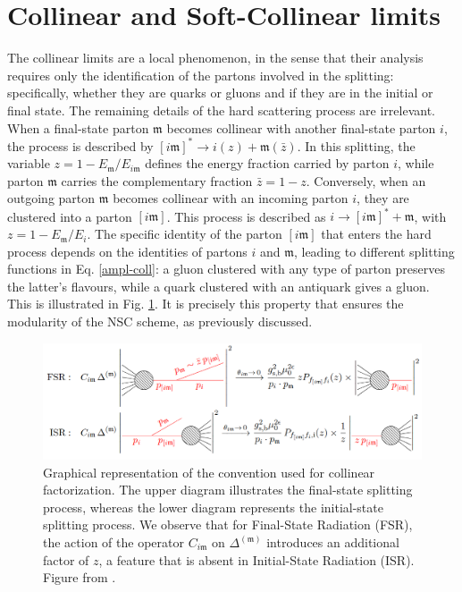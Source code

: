\documentclass[a4paper, 12pt]{book}
\newcommand{\um}{\mathfrak{m}}
\begin{document}
\section{Collinear and Soft-Collinear limits}
\label{section-coll-soft}
The collinear limits are a local phenomenon, in the sense that their analysis requires only the identification of the partons involved in the splitting: specifically, whether they are quarks or gluons and if they are in the initial or final state. The remaining details of the hard scattering process are irrelevant. When a final-state parton $\um$ becomes collinear with another final-state parton $i$, the process is described by $[i\um]^* \to i(z) + \um(\bar{z})$. In this splitting, the variable $z = 1 - E_{\um}/E_{i\um}$ defines the energy fraction carried by parton $i$, while parton $\um$ carries the complementary fraction $\bar{z}=1-z$. Conversely, when an outgoing parton $\um$ becomes collinear with an incoming parton $i$, they are clustered into a parton $[i\um]$. This process is described as $i \to [i\um]^* + \um$, with $z = 1 - E_{\um}/E_i$. The specific identity of the parton $[i\um]$ that enters the hard process depends on the identities of partons $i$ and $\um$, leading to different splitting functions in Eq. \ref{ampl-coll}: a gluon clustered with any type of parton preserves the latter's flavours, while a quark clustered with an antiquark gives a gluon. This is illustrated in Fig. \ref{hadron-collision-pict}. It is precisely this property that ensures the modularity of the NSC scheme, as previously discussed. 

\begin{figure}[!ht]
	\centering
	\includegraphics[width=1.0\textwidth]{imgs/splitting.png}
	\caption{Graphical representation of the convention used for collinear factorization. The upper diagram illustrates the final-state splitting process, whereas the lower diagram represents the initial-state splitting process. We observe that for Final-State Radiation (FSR), the action of the operator $C_{i\um}$ on $\Delta^{(\um)}$ introduces an additional factor of $z$, a feature that is absent in Initial-State Radiation (ISR). Figure from \cite{Devoto:2025kin}.}
	\label{hadron-collision-pict}
\end{figure}
\end{document}
